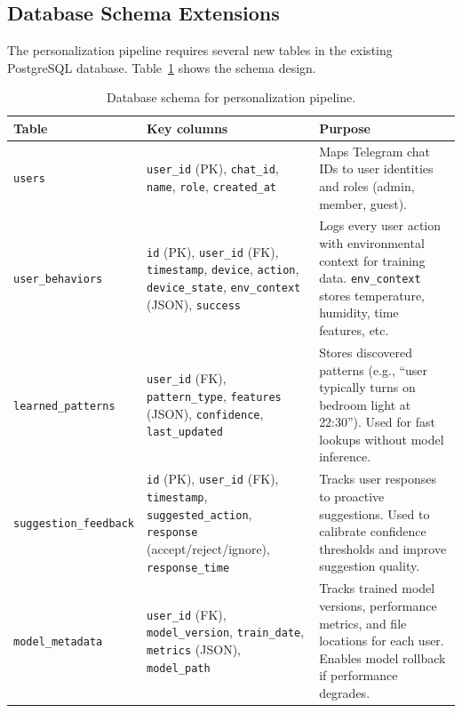 \subsection{Database Schema Extensions}
\label{sec:database-schema}

The personalization pipeline requires several new tables in the existing
PostgreSQL database. Table~\ref{tab:database-schema} shows the schema
design.

\begin{table}[H]
    \centering
    \caption{Database schema for personalization pipeline.}
    \label{tab:database-schema}
    \renewcommand{\arraystretch}{1.2}
    \small
    \begin{tabularx}{\textwidth}{@{} >{\raggedright\arraybackslash}p{2.5cm} >{\raggedright\arraybackslash}p{3.5cm} X @{}}
        \toprule
        \textbf{Table} & \textbf{Key columns} & \textbf{Purpose} \\
        \midrule
        \texttt{users} &
        \texttt{user\_id} (PK), \texttt{chat\_id}, \texttt{name}, \texttt{role}, \texttt{created\_at} &
        Maps Telegram chat IDs to user identities and roles (admin, member, guest). \\
        
        \texttt{user\_behaviors} &
        \texttt{id} (PK), \texttt{user\_id} (FK), \texttt{timestamp}, \texttt{device}, \texttt{action}, \texttt{device\_state}, \texttt{env\_context} (JSON), \texttt{success} &
        Logs every user action with environmental context for training data. \texttt{env\_context} stores temperature, humidity, time features, etc. \\
        
        \texttt{learned\_patterns} &
        \texttt{user\_id} (FK), \texttt{pattern\_type}, \texttt{features} (JSON), \texttt{confidence}, \texttt{last\_updated} &
        Stores discovered patterns (e.g., ``user typically turns on bedroom light at 22:30''). Used for fast lookups without model inference. \\
        
        \texttt{suggestion\_feedback} &
        \texttt{id} (PK), \texttt{user\_id} (FK), \texttt{timestamp}, \texttt{suggested\_action}, \texttt{response} (accept/reject/ignore), \texttt{response\_time} &
        Tracks user responses to proactive suggestions. Used to calibrate confidence thresholds and improve suggestion quality. \\
        
        \texttt{model\_metadata} &
        \texttt{user\_id} (FK), \texttt{model\_version}, \texttt{train\_date}, \texttt{metrics} (JSON), \texttt{model\_path} &
        Tracks trained model versions, performance metrics, and file locations for each user. Enables model rollback if performance degrades. \\
        \bottomrule
    \end{tabularx}
\end{table}

